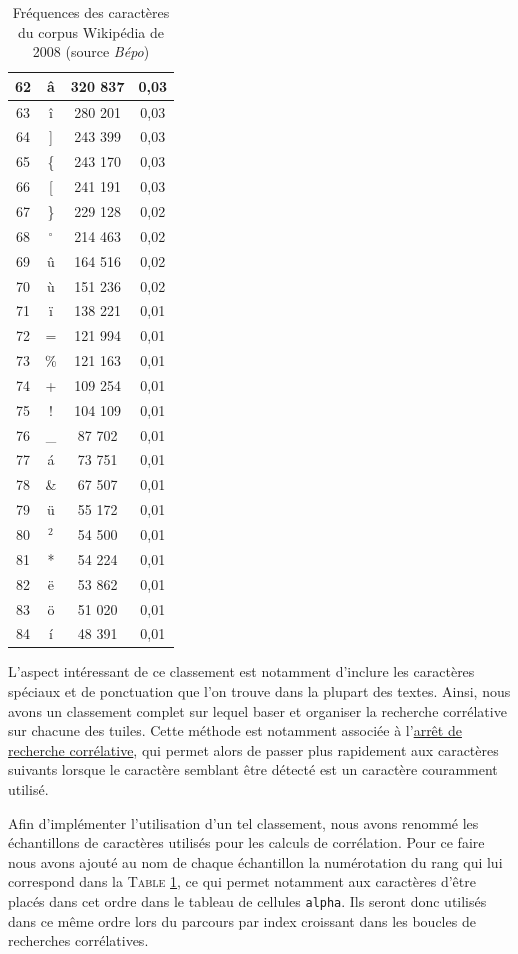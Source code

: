 \documentclass[a4paper,12pt,titlepage]{report}
\begin{document}
\begin{table}[h!]
\begin{tabular}{|c|c|c|c|}
\hline
62 & â &	320 837 & 0,03 \\
\hline
63 & î & 	280 201 & 0,03 \\
\hline
64 & ] &	243 399 & 0,03 \\
\hline
65 &\{ &	243 170 & 0,03 \\
\hline
66 & [ &	241 191 & 0,03 \\
\hline
67 &\} &	229 128 & 0,02 \\
\hline
68 &$^\circ$&214 463& 0,02 \\
\hline
69 & û &    164 516 & 0,02 \\
\hline
70 & ù &	151 236 & 0,02 \\
\hline
71 & ï &	138 221 & 0,01 \\
\hline
72 & = &	121 994 & 0,01 \\
\hline
73 &\% &	121 163 & 0,01 \\
\hline
74 & + &	109 254 & 0,01 \\
\hline
75 & ! &	104 109 & 0,01 \\
\hline
76 &\_ &	 87 702 & 0,01 \\
\hline
77 & á &	 73 751 & 0,01 \\
\hline
78 &\& &	 67 507 & 0,01 \\
\hline
79 & ü & 	 55 172 & 0,01 \\
\hline
80 &$^2$& 	 54 500 & 0,01 \\
\hline
81 & * &	 54 224 & 0,01 \\
\hline
82 & ë & 	 53 862 & 0,01 \\
\hline
83 & ö & 	 51 020 & 0,01 \\
\hline
84 & í &	 48 391 & 0,01 \\ 
\hline
\end{tabular}
\label{freq_carac}
\caption{Fréquences des caractères du corpus Wikipédia de 2008 (source \textit{Bépo})}
\end{table}	

\newpage

L'aspect intéressant de ce classement est notamment d'inclure les caractères spéciaux et de ponctuation que l'on trouve dans la plupart des textes. Ainsi, nous avons un classement complet sur lequel baser et organiser la recherche corrélative sur chacune des tuiles. Cette méthode est notamment associée à l'\hyperref[stop_cor]{arrêt de recherche corrélative}, qui permet alors de passer plus rapidement aux caractères suivants lorsque le caractère semblant être détecté est un caractère couramment utilisé.

Afin d'implémenter l'utilisation d'un tel classement, nous avons renommé les échantillons de caractères utilisés pour les calculs de corrélation. Pour ce faire nous avons ajouté au nom de chaque échantillon la numérotation du rang qui lui correspond dans la \textsc{Table \ref{freq_carac}}, ce qui permet notamment aux caractères d'être placés dans cet ordre dans le tableau de cellules \texttt{alpha}. Ils seront donc utilisés dans ce même ordre lors du parcours par index croissant dans les boucles de recherches corrélatives.
\end{document}
